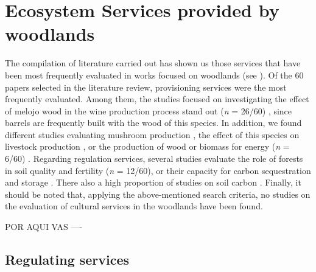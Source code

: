\section{Ecosystem Services provided by \Qp woodlands}\label{sec:es:results}
The compilation of literature carried out has shown us those services that have been most frequently evaluated in works focused on \Qp woodlands (see ). Of the 60 papers selected in the literature review, provisioning services were the most frequently evaluated. Among them, the studies focused on investigating the effect of melojo wood in the wine production process stand out (\emph{n} = 26/60) \autocites[\emph{e.g.}][]{FernandezdeSimonetal2010CharacterizationVolatile,CastroVazquezetal2013EvaluationPortuguese}, since barrels are frequently built with the wood of this species. In addition, we found different studies evaluating mushroom production \autocites[\emph{e.g.}][]{OriadeRuedaetal2010CouldArtificial}, the effect of this species on livestock production \autocites[\emph{e.g.}][]{Nunezetal2012LivestockManagement}, or the production of wood or biomass for energy (\emph{n} = 6/60) \autocites[\emph{e.g.}][]{Mirandaetal2009EnergeticCharacterization}. Regarding regulation services, several studies evaluate the role of forests in soil quality and fertility (\emph{n} = 12/60), or their capacity for carbon sequestration and storage \autocites[\emph{n} = 12/60; \emph{e.g.}][]{Alvarezetal2014InfluenceTree}. There also a high proportion of studies on soil carbon \autocites[\emph{n} = 8/60; \emph{e.g.}][]{Fonsecaetal2019ImpactTree}. Finally, it should be noted that, applying the above-mentioned search criteria, no studies on the evaluation of cultural services in the \Qpy woodlands have been found.

POR AQUI VAS ---- 
\subsection{Regulating services}\label{sec:es:regulation}
